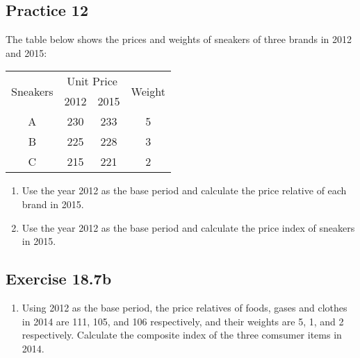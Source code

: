 \documentclass{report}
\begin{document}
\begin{multicols}{2}
  \subsection{Practice 12}

  The table below shows the prices and weights of sneakers of three brands in
  2012 and 2015:
  \begin{center}
    \begin{tabular}{|c|c|c|c|}
      \hline
      \multirow{2}{*}{Sneakers} & \multicolumn{2}{c|}{Unit Price} & \multirow{2}{*}{Weight}     \\
      \cline{2-3}
                                & 2012                            & 2015                    &   \\
      \hline
      A                         & 230                             & 233                     & 5 \\
      B                         & 225                             & 228                     & 3 \\
      C                         & 215                             & 221                     & 2 \\
      \hline
    \end{tabular}
  \end{center}
  \begin{enumerate}
    \item Use the year 2012 as the base period and calculate the price relative of each
          brand in 2015.
    \item Use the year 2012 as the base period and calculate the price index of sneakers
          in 2015.
  \end{enumerate}

  \subsection{Exercise 18.7b}

  \begin{enumerate}
    \item Using 2012 as the base period, the price relatives of foods, gases and clothes
          in 2014 are 111, 105, and 106 respectively, and their weights are 5, 1, and 2
          respectively. Calculate the composite index of the three comsumer items in
          2014.


\end{enumerate}
\end{multicols}
\end{document}
